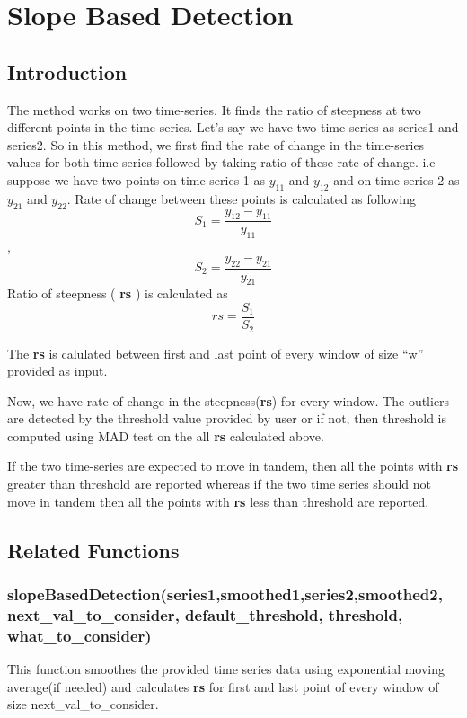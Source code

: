 \chapter{Slope Based Detection}

\section{Introduction}

The method works on two time-series. It finds the ratio of steepness 
at two different points in the time-series. Let's say we have two 
time series as series1 and series2. So in this method, we first find 
the rate of change in the time-series values for both time-series followed 
by taking ratio of these rate of change. i.e  suppose we have two points on 
time-series 1 as $y_{11}$ and $y_{12}$ and on time-series 2 as $y_{21}$ and $y_{22}$. 
Rate of change between these points is calculated as following
 $$S_1=\frac{y_{12}-y_{11}}{y_{11}}$$
 ,
  $$S_2=\frac{y_{22}-y_{21}}{y_{21}}$$
 Ratio of steepness ( \textbf{rs} ) is calculated as
 $$rs = \frac{S_1}{S_2}$$

The \textbf{rs} is calulated between first and last point of every window of
size ``w'' provided as input. 

Now, we have rate of change in the steepness(\textbf{rs}) for every window. 
The outliers are detected by the threshold value provided by user or if not, 
then threshold is computed using MAD test on the all \textbf{rs} calculated above.

If the two time-series are expected to move in tandem, then all the points 
with \textbf{rs} greater than threshold are reported whereas if the two time 
series should not move in tandem then all the points with \textbf{rs} less than 
threshold are reported. 

\section{Related Functions}

\subsection{slopeBasedDetection(series1,smoothed1,series2,smoothed2, \\ next\_val\_to\_consider, default\_threshold, threshold, what\_to\_consider)}

This function smoothes the provided time series data using exponential moving average(if needed) and 
calculates \textbf{rs} for first and last point of every window of size next{\_}val{\_}to{\_}consider.

